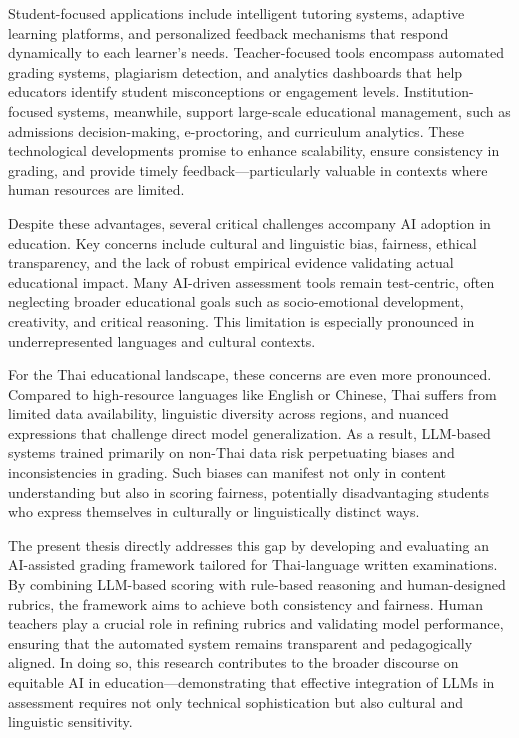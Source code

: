 Student-focused applications include intelligent tutoring 
systems, adaptive learning platforms, and personalized 
feedback mechanisms that respond dynamically to each 
learner’s needs. Teacher-focused tools encompass automated 
grading systems, plagiarism detection, and analytics 
dashboards that help educators identify student 
misconceptions or engagement levels. Institution-focused 
systems, meanwhile, support large-scale educational 
management, such as admissions decision-making, e-proctoring, 
and curriculum analytics. These technological developments 
promise to enhance scalability, ensure consistency in 
grading, and provide timely feedback—particularly valuable in 
contexts where human resources are limited.

Despite these advantages, several critical challenges accompany 
AI adoption in education. Key concerns include cultural and 
linguistic bias, fairness, ethical transparency, and the lack 
of robust empirical evidence validating actual educational 
impact. Many AI-driven assessment tools remain test-centric, 
often neglecting broader educational goals such as socio-emotional 
development, creativity, and critical reasoning. This 
limitation is especially pronounced in underrepresented 
languages and cultural contexts.

For the Thai educational landscape, these concerns are even 
more pronounced. Compared to high-resource languages like 
English or Chinese, Thai suffers from limited data 
availability, linguistic diversity across regions, and 
nuanced expressions that challenge direct model generalization. 
As a result, LLM-based systems trained primarily on non-Thai 
data risk perpetuating biases and inconsistencies in grading. 
Such biases can manifest not only in content understanding 
but also in scoring fairness, potentially disadvantaging 
students who express themselves in culturally or linguistically 
distinct ways.

The present thesis directly addresses this gap by developing 
and evaluating an AI-assisted grading framework tailored for 
Thai-language written examinations. By combining LLM-based 
scoring with rule-based reasoning and human-designed rubrics, 
the framework aims to achieve both consistency and fairness. 
Human teachers play a crucial role in refining rubrics and 
validating model performance, ensuring that the automated 
system remains transparent and pedagogically aligned. In 
doing so, this research contributes to the broader discourse 
on equitable AI in education—demonstrating that effective 
integration of LLMs in assessment requires not only technical 
sophistication but also cultural and linguistic sensitivity.


